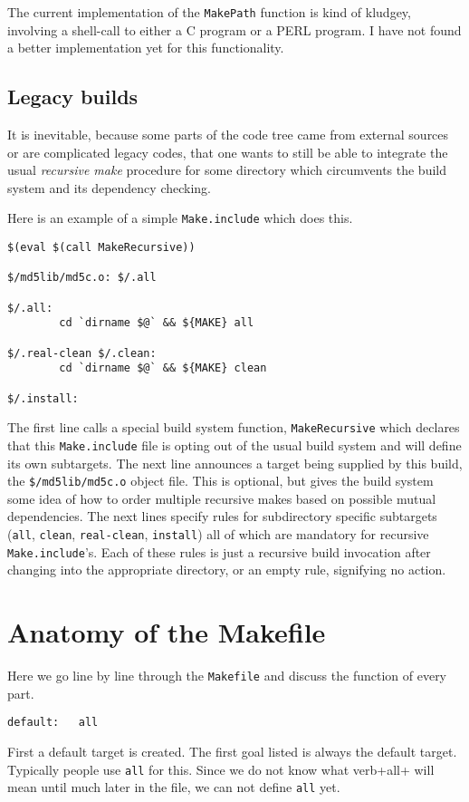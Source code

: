 \documentclass[letterpaper]{article}
\begin{document}
The current implementation of the \verb+MakePath+ function is kind of
kludgey, involving a shell-call to either a C program or a PERL
program.  I have not found a better implementation yet for this
functionality.

\subsection{Legacy builds}

It is inevitable, because some parts of the code tree
came from external sources or are complicated legacy codes, that one
wants to still be able to integrate the usual {\em recursive make}
procedure for some directory which circumvents the build system
and its dependency checking.

Here is an example of a simple \verb+Make.include+ which does this.
\begin{verbatim}
$(eval $(call MakeRecursive))

$/md5lib/md5c.o: $/.all

$/.all:
        cd `dirname $@` && ${MAKE} all

$/.real-clean $/.clean:
        cd `dirname $@` && ${MAKE} clean

$/.install:
\end{verbatim}
The first line calls a special build system function,
\verb+MakeRecursive+ which declares that this \verb+Make.include+ file
is opting out of the usual build system and will define its own
subtargets.  The next line announces a target being supplied by this
build, the \verb+$/md5lib/md5c.o+ object file.  This is optional, but
gives the build system some idea of how to order multiple recursive
makes based on possible mutual dependencies.  The next lines specify
rules for subdirectory specific subtargets (\verb+all+, \verb+clean+,
\verb+real-clean+, \verb+install+) all of which are mandatory for
recursive \verb+Make.include+'s.  Each of these rules is just a
recursive build invocation after changing into the appropriate
directory, or an empty rule, signifying no action.


\section{Anatomy of the Makefile}

Here we go line by line through the \verb+Makefile+ and discuss the function
of every part.

\begin{verbatim}
default:   all
\end{verbatim}
First a default target is created.  The first goal listed is always
the default target.  Typically people use \verb+all+ for this.  Since
we do not know what verb+all+ will mean until much later in the file,
we can not define \verb+all+ yet.
\end{document}
